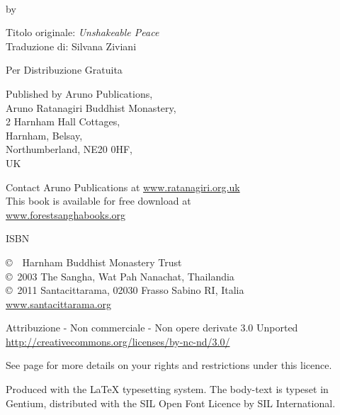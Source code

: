 {\small\setlength{\parskip}{0.8em}\setlength{\parindent}{0em}%
{\raggedright%

\thetitle\\
by \theauthor

Titolo originale: \textit{Unshakeable Peace}\\
Traduzione di: Silvana Ziviani

Per Distribuzione Gratuita

Published by Aruno Publications,\\
Aruno Ratanagiri Buddhist Monastery,\\
2 Harnham Hall Cottages,\\
Harnham, Belsay,\\
Northumberland, NE20 0HF,\\
UK

Contact Aruno Publications at \href{http://ratanagiri.org.uk}{www.ratanagiri.org.uk}\\

This book is available for free download at\\
\href{http://forestsanghabooks.org/}{www.forestsanghabooks.org}

ISBN \theISBN

\copyright\ \the\year\ Harnham Buddhist Monastery Trust\\
\copyright\ 2003 The Sangha, Wat Pah Nanachat, Thailandia\\
\copyright\ 2011 Santacittarama, 02030 Frasso Sabino RI, Italia\\
\href{http://www.santacittarama.org/}{www.santacittarama.org}

\vfill

{\footnotesize
Attribuzione - Non commerciale - Non opere derivate 3.0 Unported\\
\href{http://creativecommons.org/licenses/by-nc-nd/3.0/}{http://creativecommons.org/licenses/by-nc-nd/3.0/}

See page \pageref{copyright-details} for more details on your rights and restrictions under this licence.

Produced with the {\selectfont\LaTeX} typesetting system. The body-text is typeset in Gentium, distributed with the SIL Open Font Licence by SIL International.

\theEditionInfo\\
\thePrintedByInfo

}
}}

